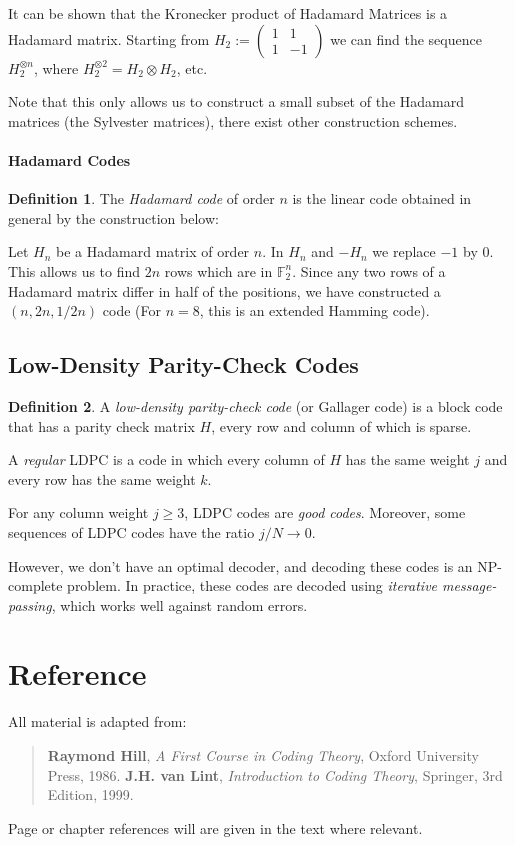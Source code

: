 \documentclass[11pt,a4paper]{article}
\theoremstyle{definition}
\newtheorem{definition}{Definition}[section]
\theoremstyle{plain}
\theoremstyle{remark}
\begin{document}
It can be shown that the Kronecker product of Hadamard Matrices is a Hadamard matrix. 
Starting from $H_2 := \begin{pmatrix}
    1 & 1 \\
    1 & -1 
\end{pmatrix}$ we can find the sequence $H_2^{\otimes n}$, where $H_2^{\otimes 2} = H_2 \otimes H_2$, etc. 

Note that this only allows us to construct a small subset of the Hadamard matrices (the Sylvester matrices), there exist other construction schemes.

\paragraph{Hadamard Codes} 
\begin{definition}
    The \emph{Hadamard code} of order $n$ is the linear code obtained in general by the construction below:
    
    Let $H_n$ be a Hadamard matrix of order $n$. In $H_n$ and $- H_n$ we replace $-1$ by $0$. 
    This allows us to find $2n$ rows which are in $\mathbb{F}_2^n$. Since any two rows of a Hadamard matrix differ in half of the positions, 
    we have constructed a $(n, 2n, 1/2 n)$ code (For $n = 8$, this is an extended Hamming code). 
\end{definition}

\subsection{Low-Density Parity-Check Codes} 
\begin{definition}
    A \emph{low-density parity-check code} (or Gallager code) is a block code that has a parity check matrix $H$, 
    every row and column of which is sparse. 

    A \emph{regular} LDPC is a code in which every column of $H$ has the same weight $j$ and every row has the same 
    weight $k$. 
\end{definition}

For any column weight $j \geq 3$, LDPC codes are \emph{good codes}. Moreover, some sequences of 
LDPC codes have the ratio $j / N \to 0$.  

However, we don't have an optimal decoder, and decoding these codes is an NP-complete problem. In practice,
these codes are decoded using \emph{iterative message-passing}, which works well against random errors. 
\section{Reference}
All material is adapted from: 
\begin{quote}
    \textbf{Raymond Hill}, \emph{A First Course in Coding Theory}, Oxford University Press, 1986.
    \textbf{J.H. van Lint}, \emph{Introduction to Coding Theory}, Springer, 3rd Edition, 1999.
\end{quote}
Page or chapter references will are given in the text where relevant. 
\end{document}
